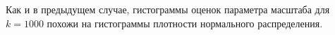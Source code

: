\documentclass[14pt, a4paper, russian]{report}
\begin{document}





Как и в предыдущем случае, гистограммы оценок параметра масштаба для $k = 1000$ похожи на гистограммы плотности нормального распределения.

\newpage

\end{document}
